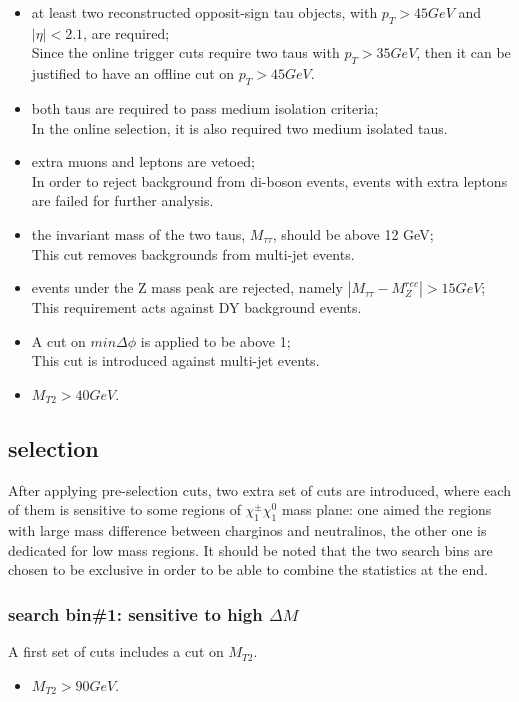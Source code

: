 \begin{itemize}
\item at least two reconstructed opposit-sign tau objects, with $p_T>45GeV$ and $|\eta|<2.1$, are required;\\ Since the online trigger cuts require two taus with $p_T>35GeV$, then it can be justified to have an offline cut on $p_T>45GeV$. 
\item both taus are required to pass medium isolation criteria;\\ In the online selection, it is also required two medium isolated taus.
\item extra muons and leptons are vetoed;\\ In order to reject background from di-boson events, events with extra leptons are failed for further analysis.
\item the invariant mass of the two taus, $M_{\tau\tau}$, should be above 12 GeV;\\ This cut removes backgrounds from multi-jet events. 
\item events under the Z mass peak are rejected, namely $|M_{\tau\tau}-M_Z^{rec}|>15GeV$;\\ This requirement acts against DY background events. 
\item A cut on $min\Delta\phi$ is applied to be above 1;\\ This cut is introduced against multi-jet events.   
\item $M_{T2}>40GeV$. 
\end{itemize}
\subsection{selection}
After applying pre-selection cuts, two extra set of cuts are introduced, where each of them is sensitive to some regions of $\chi_{1}^{\pm}\chi_{1}^{0}$ mass plane: one aimed the regions with large mass difference between charginos and neutralinos, the other one is dedicated for low mass regions. It should be noted that the two search bins are chosen to be exclusive in order to be able to combine the statistics at the end.
\subsubsection{search bin\#1: sensitive to high $\Delta M$}
A first set of cuts includes a cut on $M_{T2}$.
\begin{itemize}
\item $M_{T2}>90GeV$.
\end{itemize}
